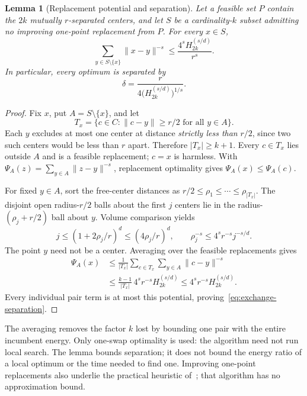 \documentclass[a4paper,12pt]{article}
\newtheorem{lemma}[theorem]{Lemma}
\numberwithin{equation}{section}
\begin{document}
\begin{lemma}[Replacement potential and separation]\label{lem:exchange}
Let a feasible set $P$ contain the $2k$ mutually $r$-separated centers, and let $S$ be a
cardinality-$k$ subset admitting no improving one-point replacement from $P$. For every $x\in S$,
\begin{equation}\label{eq:local-potential}
 \sum_{y\in S\setminus\{x\}}\|x-y\|^{-s}
 \le \frac{4^s H_{2k}^{(s/d)}}{r^s}.
\end{equation}
In particular, every optimum is separated by
\begin{equation}\label{eq:exchange-separation}
 \delta=\frac{r}{4\bigl(H_{2k}^{(s/d)}\bigr)^{1/s}}.
\end{equation}
\end{lemma}
\begin{proof}
Fix $x$, put $A=S\setminus\{x\}$, and let
\[
 T_x=\{c\in C:\|c-y\|\ge r/2\text{ for all }y\in A\}.
\]
Each $y$ excludes at most one center at distance \emph{strictly less than} $r/2$, since two such
centers would be less than $r$ apart. Therefore $|T_x|\ge k+1$. Every $c\in T_x$ lies outside $A$
and is a feasible replacement; $c=x$ is harmless. With $\Psi_A(z)=\sum_{y\in A}\|z-y\|^{-s}$,
replacement optimality gives $\Psi_A(x)\le\Psi_A(c)$.

For fixed $y\in A$, sort the free-center distances as $r/2\le\rho_1\le\cdots\le\rho_{|T_x|}$. The
disjoint open radius-$r/2$ balls about the first $j$ centers lie in the radius-$(\rho_j+r/2)$ ball
about $y$. Volume comparison yields
\[
 j\le(1+2\rho_j/r)^d\le(4\rho_j/r)^d,
 \qquad \rho_j^{-s}\le4^s r^{-s}j^{-s/d}.
\]
The point $y$ need not be a center. Averaging over the feasible replacements gives
\begin{align*}
 \Psi_A(x)&\le\frac1{|T_x|}\sum_{c\in T_x}\sum_{y\in A}\|c-y\|^{-s}\\
 &\le\frac{k-1}{|T_x|}\,4^s r^{-s}H_{2k}^{(s/d)}
 \le4^s r^{-s}H_{2k}^{(s/d)}.
\end{align*}
Every individual pair term is at most this potential, proving~\eqref{eq:exchange-separation}.
\end{proof}
The averaging removes the factor $k$ lost by bounding one pair with the entire incumbent energy.
Only one-swap optimality is used: the algorithm need not run local search. The lemma bounds
separation; it does not bound the energy ratio of a local optimum or the time needed to find one. Improving one-point replacements
also underlie the practical heuristic of~\cite[Algorithm 3]{falcon2026}; that algorithm has no
approximation bound.
\end{document}
